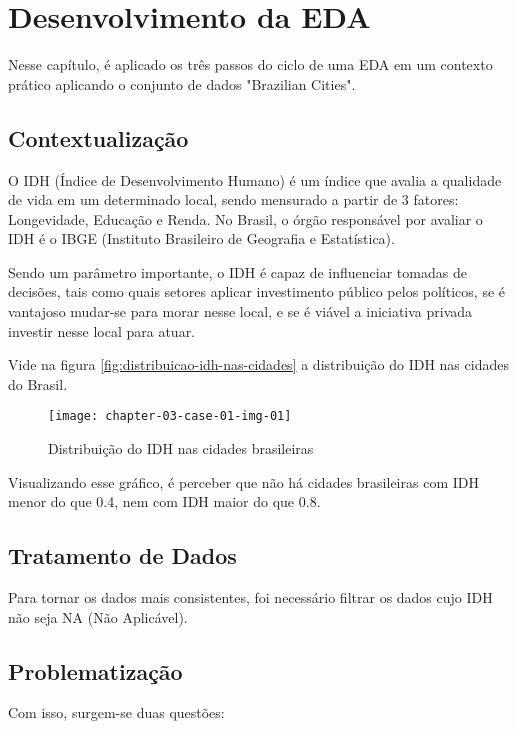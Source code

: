 \chapter{Desenvolvimento da EDA}

Nesse capítulo, é aplicado os três passos do ciclo de uma EDA em um contexto prático aplicando o conjunto de dados "Brazilian Cities".

\section{Contextualização}

O IDH (Índice de Desenvolvimento Humano) é um índice que avalia a qualidade de vida em um determinado local, sendo mensurado a partir de 3 fatores: Longevidade, Educação e Renda. No Brasil, o órgão responsável por avaliar o IDH é o IBGE (Instituto Brasileiro de Geografia e Estatística).

Sendo um parâmetro importante, o IDH é capaz de influenciar tomadas de decisões, tais como quais setores aplicar investimento público pelos políticos, se é vantajoso mudar-se para morar nesse local, e se é viável a iniciativa privada investir nesse local para atuar.

Vide na figura \autoref{fig:distribuicao-idh-nas-cidades} a distribuição do IDH nas cidades do Brasil.

\begin{figure}[H]
  \centering
  \caption{\label{fig:distribuicao-idh-nas-cidades}Distribuição do IDH nas cidades brasileiras}
  \label{fig:der}
  \texttt{[image: chapter-03-case-01-img-01]}
\end{figure}

Visualizando esse gráfico, é perceber que não há cidades brasileiras com IDH menor do que 0.4, nem com IDH maior do que 0.8.

\section{Tratamento de Dados}

Para tornar os dados mais consistentes, foi necessário filtrar os dados cujo IDH não seja NA (Não Aplicável).

\section{Problematização}

Com isso, surgem-se duas questões: 

